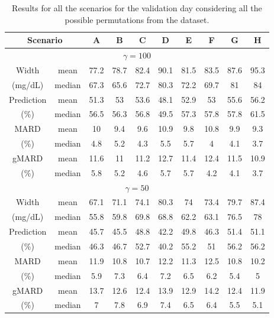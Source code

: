 \begin{table}[hbt]
	\centering
	\begin{tabular}{| c | c | c | c | c | c | c | c | c | c |} 
	\hline
	\multicolumn{2}{|c|}{Scenario} & A & B & C & D & E & F & G & H \\											
	\hline
	\multicolumn{10}{|c|}{$\gamma = 100$} \\
	\hline
	Width & mean & 77.2 & 78.7 & 82.4 & 90.1 & 81.5 & 83.5 & 87.6 & 95.3 \\
	(mg/dL) & median & 67.3 & 65.6 & 72.7 & 80.3 & 72.2 & 69.7 & 81 & 84 \\
	\hline
	Prediction & mean & 51.3 & 53 & 53.6 & 48.1 & 52.9 & 53 & 55.6 & 56.2 \\
	(\%) & median & 56.5 & 56.3 & 56.8 & 49.5 & 57.3 & 57.8 & 57.8 & 61.5 \\
	\hline
	MARD & mean & 10 & 9.4 & 9.6 & 10.9 & 9.8 & 10.8 & 9.9 & 9.3 \\
	(\%) & median & 4.8 &	5.2 & 4.3 & 5.5 & 5.7 & 4 & 4.1 & 3.7 \\
	\hline
	gMARD & mean & 11.6	& 11 & 11.2 & 12.7 & 11.4 & 12.4 & 11.5 & 10.9 \\
	(\%) & median & 5.8 & 5.2 & 4.6 & 5.7 & 5.7 & 4.2 & 4.1 & 3.7 \\
\hline
\multicolumn{10}{|c|}{$\gamma = 50$} \\
\hline
Width & mean & 67.1 & 71.1 & 74.1 & 80.3 & 74 & 73.4 & 79.7 & 87.4 \\
(mg/dL) & median & 55.8 & 59.8 & 69.8 & 68.8 & 62.2 & 63.1 & 76.5 & 78 \\
\hline
Prediction & mean & 45.7 & 45.5 & 48.8 & 42.2 & 49.8 & 46.3 & 51.4 & 51.1 \\
(\%) & median & 46.3 & 46.7 & 52.7 & 40.2 & 55.2 & 51 & 56.2 & 56.2 \\
\hline
MARD & mean & 11.9 & 10.8 & 10.7 & 12.2 & 11.3 & 12.5 & 10.8 & 10.2 \\
(\%) & median & 5.9 & 7.3 & 6.4 & 7.2 & 6.5 & 6.2 & 5.4 & 5 \\
\hline
gMARD & mean & 13.7 & 12.6 & 12.4 & 13.9 & 12.9 & 14.2 & 12.4 & 11.9 \\
(\%) & median & 7 & 7.8 & 6.9 & 7.4 & 6.5 & 6.4 & 5.5 & 5.1 \\
\hline
	\end{tabular}
\caption{Results for all the scenarios for the validation day considering all the possible permutations from the dataset.}
\label{tab:resultsval8scenarios}
\end{table}

